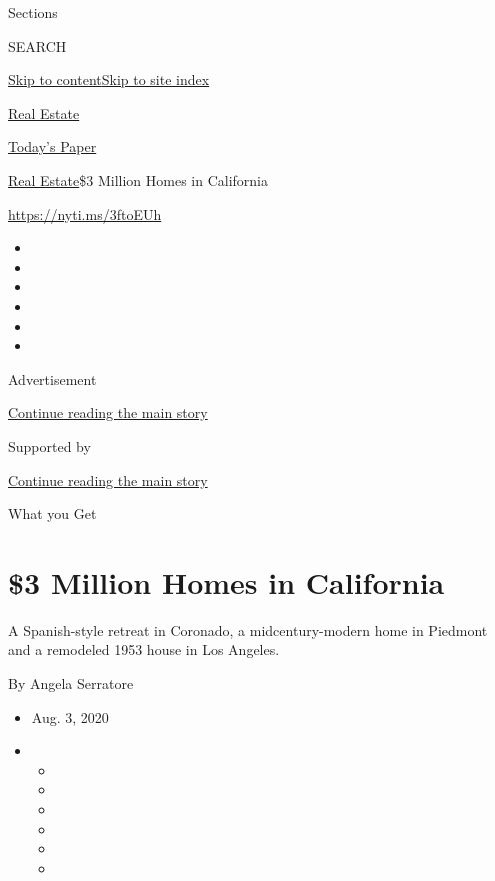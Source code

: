 Sections

SEARCH

\protect\hyperlink{site-content}{Skip to
content}\protect\hyperlink{site-index}{Skip to site index}

\href{https://www.nytimes3xbfgragh.onion/section/realestate}{Real
Estate}

\href{https://myaccount.nytimes3xbfgragh.onion/auth/login?response_type=cookie\&client_id=vi}{}

\href{https://www.nytimes3xbfgragh.onion/section/todayspaper}{Today's
Paper}

\href{/section/realestate}{Real Estate}\textbar{}\$3 Million Homes in
California

\url{https://nyti.ms/3ftoEUh}

\begin{itemize}
\item
\item
\item
\item
\item
\item
\end{itemize}

Advertisement

\protect\hyperlink{after-top}{Continue reading the main story}

Supported by

\protect\hyperlink{after-sponsor}{Continue reading the main story}

What you Get

\hypertarget{3-million-homes-in-california}{%
\section{\$3 Million Homes in
California}\label{3-million-homes-in-california}}

A Spanish-style retreat in Coronado, a midcentury-modern home in
Piedmont and a remodeled 1953 house in Los Angeles.

By Angela Serratore

\begin{itemize}
\item
  Aug. 3, 2020
\item
  \begin{itemize}
  \item
  \item
  \item
  \item
  \item
  \item
  \end{itemize}
\end{itemize}


